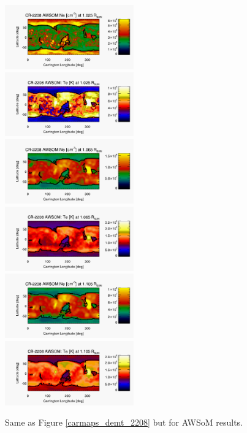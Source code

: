 \documentclass[namedreferences]{solarphysics}
\begin{document}
\begin{article}
\begin{figure}%
\begin{center}
\includegraphics[width=0.495\textwidth]{figs/map_Ne_awsom_2208_185_short_1025_Rsun.pdf}
\includegraphics[width=0.495\textwidth]{figs/map_Te_awsom_2208_185_short_1025_Rsun.pdf}
\includegraphics[width=0.495\textwidth]{figs/map_Ne_awsom_2208_185_short_1065_Rsun.pdf}
\includegraphics[width=0.495\textwidth]{figs/map_Te_awsom_2208_185_short_1065_Rsun.pdf}
\includegraphics[width=0.495\textwidth]{figs/map_Ne_awsom_2208_185_short_1105_Rsun.pdf}
\includegraphics[width=0.495\textwidth]{figs/map_Te_awsom_2208_185_short_1105_Rsun.pdf}
\caption{Same as Figure \ref{carmaps_demt_2208} but for AWSoM results.}
\label{carmaps_awsom_2208}
\end{center}
\end{figure}


\end{article}
\end{document}
